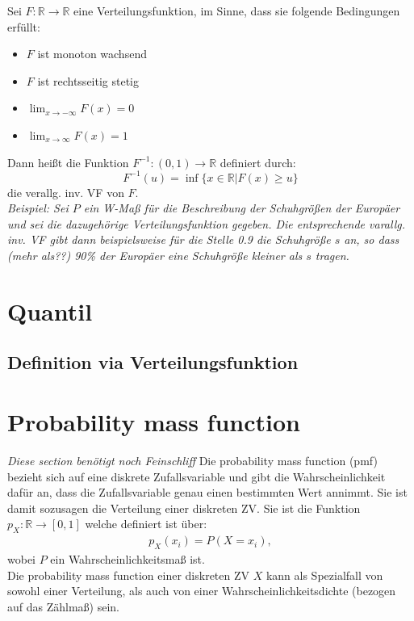\documentclass[paper=a4,10pt]{scrartcl}
\begin{document}
\noindent 
Sei $F: \mathbb{R} \rightarrow \mathbb{R}$ eine Verteilungsfunktion, im Sinne, dass sie folgende Bedingungen erfüllt:
\begin{itemize}
\item $F$ ist monoton wachsend
\item $F$ ist rechtsseitig stetig
\item $\lim_{x \rightarrow -\infty} F(x) = 0$
\item $\lim_{x \rightarrow \infty} F(x) = 1$
\end{itemize}
Dann heißt die Funktion $F^{-1}: (0,1) \rightarrow \mathbb{R}$ definiert durch:
\begin{equation*}
F^{-1}(u) = \inf \{ x \in \mathbb{R} | F(x) \geq u\}
\end{equation*}
die verallg. inv. VF von $F$.\\

\noindent
\textit{Beispiel: Sei $P$ ein W-Maß für die Beschreibung der Schuhgrößen der Europäer und sei die dazugehörige Verteilungsfunktion gegeben. Die entsprechende varallg. inv. VF gibt dann beispielsweise für die Stelle 0.9 die Schuhgröße $s$ an, so dass (mehr als??) 90\% der Europäer eine Schuhgröße kleiner als $s$ tragen.}

\section{Quantil}
\subsection{Definition via Verteilungsfunktion}


\section{Probability mass function}
\textit{Diese section benötigt noch Feinschliff}
Die probability mass function (pmf) bezieht sich auf eine diskrete Zufallsvariable und gibt die Wahrscheinlichkeit dafür an, dass die Zufallsvariable genau einen bestimmten Wert annimmt. Sie ist damit sozusagen die Verteilung einer diskreten ZV.
Sie ist die Funktion $p_X : \mathbb{R} \rightarrow [0,1]$ welche definiert ist über:
\begin{align}
p_X(x_i) = P(X=x_i),
\end{align}
wobei $P$ ein Wahrscheinlichkeitsmaß ist.\\
Die probability mass function einer diskreten ZV $X$ kann als Spezialfall von sowohl einer Verteilung, als auch von einer Wahrscheinlichkeitsdichte (bezogen auf das Zählmaß) sein.
\end{document}

